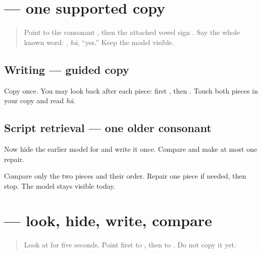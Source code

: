 \section[\texorpdfstring{\gu{હા} (hā)}{હા (hā)}]{ — one supported copy}

\label{lesson:GU-W01-haa-guided-copy}



\begin{quote}
Point to the consonant \textbf{}, then the attached vowel sign \textbf{}. Say the whole known word: \textbf{}, \emph{hā}, \textquotedblleft{}yes.\textquotedblright{} Keep the model visible.
\end{quote}

\subsection*{Writing — guided copy}

Copy \textbf{} once. You may look back after each piece: first \textbf{}, then \textbf{}. Touch both pieces in your copy and read \emph{hā}.

\subsection*{Script retrieval — one older consonant}
Now hide the earlier model for \textbf{} and write it once. Compare and make at most one repair.

\begin{tcolorbox}[breakable,colback=teal!4,colframe=teal!35!black,title={Before you move on}]
Compare only the two pieces and their order. Repair one piece if needed, then stop. The model stays visible today.
\end{tcolorbox}
\section[\texorpdfstring{\gu{હા} (hā)}{હા (hā)}]{ — look, hide, write, compare}

\label{lesson:GU-W01-haa-delayed-copy}



\begin{quote}
Look at \textbf{} for five seconds. Point first to \textbf{}, then to \textbf{}. Do not copy it yet.
\end{quote}

